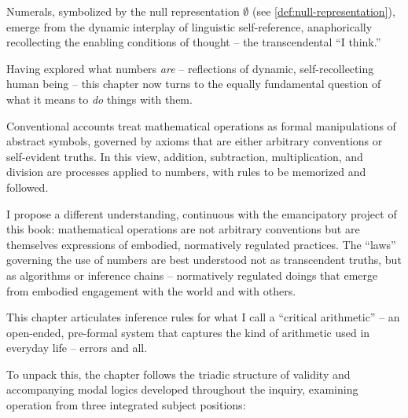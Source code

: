 \documentclass[12pt]{book}
\begin{document}
Numerals, symbolized by the null representation $\emptyset$ (see \ref{def:null-representation}), emerge from the dynamic interplay of linguistic self-reference, anaphorically recollecting the enabling conditions of thought  -- the transcendental ``I think.''

Having explored what numbers \textit{are}  -- reflections of dynamic, self-recollecting human being  -- this chapter now turns to the equally fundamental question of what it means to \textit{do} things with them.

Conventional accounts treat mathematical operations as formal manipulations of abstract symbols, governed by axioms that are either arbitrary conventions or self-evident truths. In this view, addition, subtraction, multiplication, and division are processes applied to numbers, with rules to be memorized and followed.

I propose a different understanding, continuous with the emancipatory project of this book: mathematical operations are not arbitrary conventions but are themselves expressions of embodied, normatively regulated practices. The ``laws'' governing the use of numbers are best understood not as transcendent truths, but as algorithms or inference chains  -- normatively regulated doings that emerge from embodied engagement with the world and with others.

This chapter articulates inference rules for what I call a ``critical arithmetic''  -- an open-ended, pre-formal system that captures the kind of arithmetic used in everyday life  -- errors and all.

To unpack this, the chapter follows the triadic structure of validity and accompanying modal logics developed throughout the inquiry, examining operation from three integrated subject positions:
\end{document}
